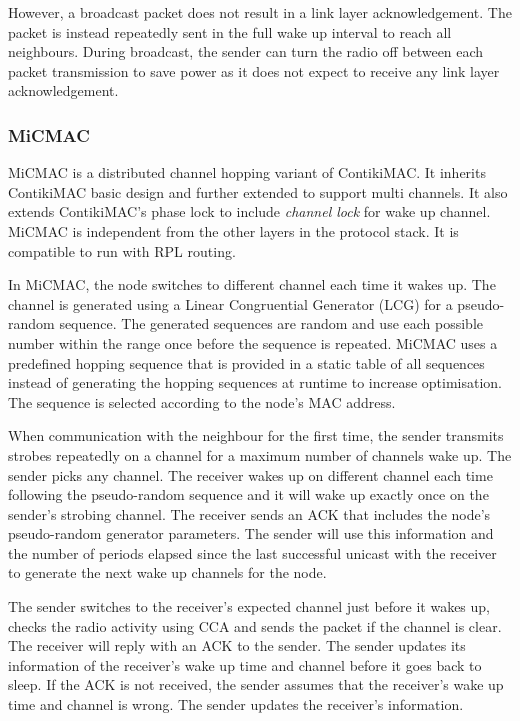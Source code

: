 However, a broadcast packet does not result in a link layer acknowledgement. The packet is instead repeatedly sent in the full wake up interval to reach all neighbours. During broadcast, the sender can turn the radio off between each packet transmission to save power as it does not expect to receive any link layer acknowledgement.



\subsubsection{MiCMAC}
MiCMAC \cite{micmac} is a distributed channel hopping variant of ContikiMAC. It inherits ContikiMAC basic design and further extended to support multi channels. It also extends ContikiMAC's phase lock to include \textit{channel lock} for wake up channel. MiCMAC is independent from the other layers in the protocol stack. It is compatible to run with RPL routing.

In MiCMAC, the node switches to different channel each time it wakes up. The channel is generated using a Linear Congruential Generator (LCG) for a pseudo-random sequence. The generated sequences are random and use each possible number within the range once before the sequence is repeated. MiCMAC uses a predefined hopping sequence that is provided in a static table of all sequences instead of generating the hopping sequences at runtime to increase optimisation. The sequence is selected according to the node's MAC address.

When communication with the neighbour for the first time, the sender transmits strobes repeatedly on a channel for a maximum number of channels wake up. The sender picks any channel. The receiver wakes up on different channel each time following the pseudo-random sequence and it will wake up exactly once on the sender's strobing channel. The receiver sends an ACK that includes the node's pseudo-random generator parameters. The sender will use this information and the number of periods elapsed since the last successful unicast with the receiver to generate the next wake up channels for the node.

The sender switches to the receiver's expected channel just before it wakes up, checks the radio activity using CCA and sends the packet if the channel is clear. The receiver will reply with an ACK to the sender. The sender updates its information of the receiver's wake up time and channel before it goes back to sleep. If the ACK is not received, the sender assumes that the receiver's wake up time and channel is wrong. The sender updates the receiver's information. 

